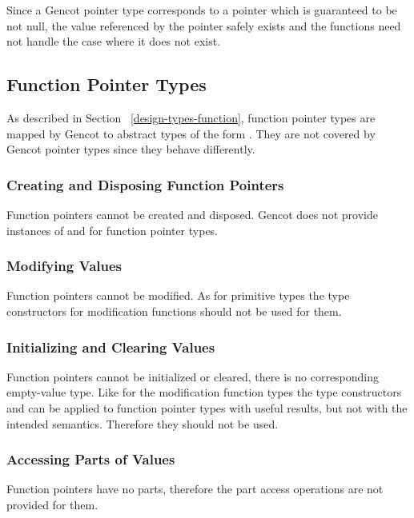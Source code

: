 Since a Gencot pointer type corresponds to a pointer which is guaranteed to be not null, the value referenced by the 
pointer safely exists and the functions need not handle the case where it does not exist.

\subsection{Function Pointer Types}
\label{design-operations-function}

As described in Section ~\ref{design-types-function}, function pointer types are mapped by Gencot to abstract types of the form 
. They are not covered by Gencot pointer types since they behave differently.

\subsubsection{Creating and Disposing Function Pointers}

Function pointers cannot be created and disposed. Gencot does not provide instances of  and 
for function pointer types.

\subsubsection{Modifying Values}

Function pointers cannot be modified. As for primitive types the type constructors for modification functions should not be used for them.

\subsubsection{Initializing and Clearing Values}

Function pointers cannot be initialized or cleared, there is no corresponding empty-value type.
Like for the modification function types the type constructors
 and  can be applied to function pointer types with useful results, but not with the intended semantics.
Therefore they should not be used.

\subsubsection{Accessing Parts of Values}

Function pointers have no parts, therefore the part access operations are not provided for them.

